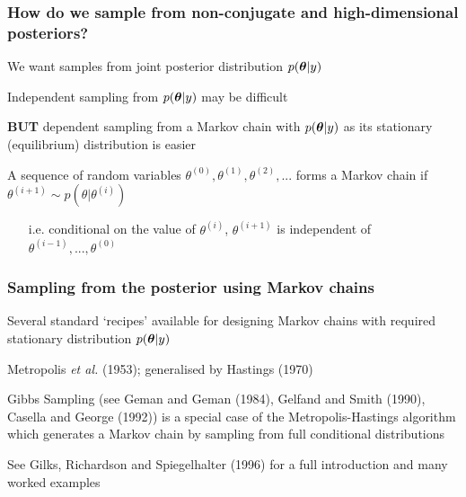 \begin{frame}

\frametitle{How do we sample from non-conjugate and high-dimensional posteriors?}

\bibig
\item We want samples from joint posterior distribution $p(\boldsymbol{\theta} | y)$\vspace{2mm}
\item \alert{Independent} sampling from $p(\boldsymbol{\theta} | y)$ may be difficult\vspace{2mm}
\item {\bf BUT} \alert{dependent} sampling from a \alert{Markov chain} with
   $p(\boldsymbol{\theta} | y)$ as its  stationary (equilibrium) distribution is easier \vspace{2mm}
\item A sequence of random variables
$\theta^{(0)},\theta^{(1)},\theta^{(2)},...$
   forms a Markov chain if $\theta^{(i+1)}  \sim  p(\theta | \theta^{(i)})$ \\ \vspace{1mm}
   \begin{itemize}
   \item[i.e.] conditional on the value of $\theta^{(i)} $,
   $\theta^{(i+1)}$ is independent of $\theta^{(i-1)},..., \theta^{(0)}$
   \end{itemize}
\eibig

\end{frame}

\begin{frame}

\frametitle{Sampling from the posterior using Markov chains}

Several standard \lq recipes' available for designing
      Markov chains with required stationary distribution $p(\boldsymbol{\theta} | y)$\vspace{2mm}
      \bibig
      \item Metropolis {\it et al.} (1953); generalised by Hastings (1970)\vspace{2mm}
      \item \alert{Gibbs Sampling} (see Geman and Geman (1984), Gelfand
           and Smith (1990), Casella and George (1992)) is a special case of
           the Metropolis-Hastings algorithm which  generates a
           Markov chain by sampling from \alert{full conditional distributions}\vspace{2mm}
      \item See Gilks, Richardson and  Spiegelhalter (1996) for a full
            introduction and many worked examples
\eibig

\end{frame}

